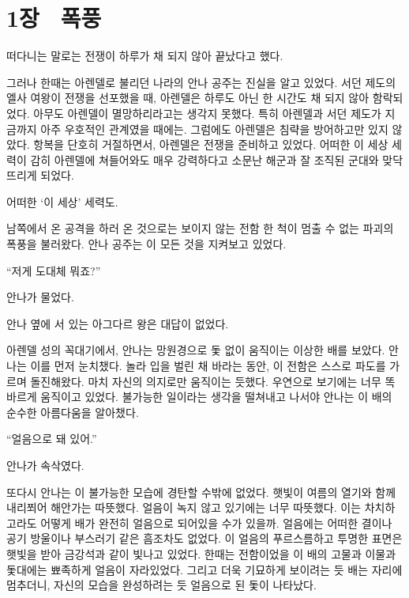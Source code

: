 

\chapter[1장  폭풍][1장\hspace*{.5em}폭풍]{1장 \ 폭풍}



떠다니는 말로는 전쟁이 하루가 채 되지 않아 끝났다고 했다.

그러나 한때는 아렌델로 불리던 나라의 안나 공주는 진실을 알고 있었다. 서던 제도의 엘사 여왕이 전쟁을 선포했을 때, 아렌델은 하루도 아닌 한 시간도 채 되지 않아 함락되었다. 아무도 아렌델이 멸망하리라고는 생각지 못했다. 특히 아렌델과 서던 제도가 지금까지 아주 우호적인 관계였을 때에는. 그럼에도 아렌델은 침략을 방어하고만 있지 않았다. 항복을 단호히 거절하면서, 아렌델은 전쟁을 준비하고 있었다. 어떠한 이 세상 세력이 감히 아렌델에 쳐들어와도 매우 강력하다고 소문난 해군과 잘 조직된 군대와 맞닥뜨리게 되었다.

어떠한 `이 세상' 세력도.

남쪽에서 온 공격을 하러 온 것으로는 보이지 않는 전함 한 척이 멈출 수 없는 파괴의 폭풍을 불러왔다. 안나 공주는 이 모든 것을 지켜보고 있었다.

\textbreak

\forceindent``저게 도대체 뭐죠?''

안나가 물었다.

안나 옆에 서 있는 아그다르 왕은 대답이 없었다.

아렌델 성의 꼭대기에서, 안나는 망원경으로 돛 없이 움직이는 이상한 배를 보았다. 안나는 이를 먼저 눈치챘다. 놀라 입을 벌린 채 바라는 동안, 이 전함은 스스로 파도를 가르며 돌진해왔다. 마치 자신의 의지로만 움직이는 듯했다. 우연으로 보기에는 너무 똑바르게 움직이고 있었다. 불가능한 일이라는 생각을 떨쳐내고 나서야 안나는 이 배의 순수한 아름다움을 알아챘다.

``얼음으로 돼 있어.''

안나가 속삭였다.

또다시 안나는 이 불가능한 모습에 경탄할 수밖에 없었다. 햇빛이 여름의 열기와 함께 내리쬐어 해안가는 따뜻했다. 얼음이 녹지 않고 있기에는 너무 따뜻했다. 이는 차치하고라도 어떻게 배가 완전히 얼음으로 되어있을 수가 있을까. 얼음에는 어떠한 결이나 공기 방울이나 부스러기 같은 흠조차도 없었다. 이 얼음의 푸르스름하고 투명한 표면은 햇빛을 받아 금강석과 같이 빛나고 있었다. 한때는 전함이었을 이 배의 고물과 이물과 돛대에는 뾰족하게 얼음이 자라있었다. 그리고 더욱 기묘하게 보이려는 듯 배는 자리에 멈추더니, 자신의 모습을 완성하려는 듯 얼음으로 된 돛이 나타났다.

